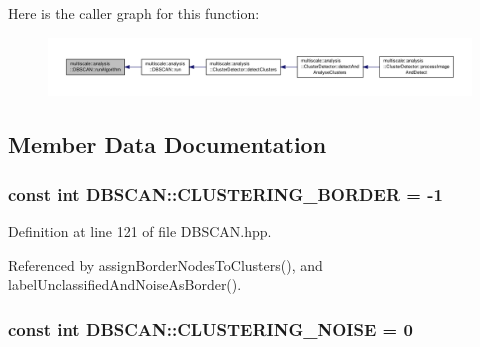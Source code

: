 Here is the caller graph for this function\-:\nopagebreak
\begin{figure}[H]
\begin{center}
\leavevmode
\includegraphics[width=350pt]{classmultiscale_1_1analysis_1_1DBSCAN_aceb5dd9fe24a24cbf09ddc9082dc1f82_icgraph}
\end{center}
\end{figure}




\subsection{Member Data Documentation}
\hypertarget{classmultiscale_1_1analysis_1_1DBSCAN_a28f37ffc029ccd1d121cbc4467851ce2}{
\subsubsection[{C\-L\-U\-S\-T\-E\-R\-I\-N\-G\-\_\-\-B\-O\-R\-D\-E\-R}]{\setlength{\rightskip}{0pt plus 5cm}const int D\-B\-S\-C\-A\-N\-::\-C\-L\-U\-S\-T\-E\-R\-I\-N\-G\-\_\-\-B\-O\-R\-D\-E\-R = -\/1\hspace{0.3cm}{\ttfamily [static]}}}\label{classmultiscale_1_1analysis_1_1DBSCAN_a28f37ffc029ccd1d121cbc4467851ce2}


Definition at line 121 of file D\-B\-S\-C\-A\-N.\-hpp.



Referenced by assign\-Border\-Nodes\-To\-Clusters(), and label\-Unclassified\-And\-Noise\-As\-Border().

\hypertarget{classmultiscale_1_1analysis_1_1DBSCAN_a480b43a01f8652787a4b0f61b00ee3cf}{
\subsubsection[{C\-L\-U\-S\-T\-E\-R\-I\-N\-G\-\_\-\-N\-O\-I\-S\-E}]{\setlength{\rightskip}{0pt plus 5cm}const int D\-B\-S\-C\-A\-N\-::\-C\-L\-U\-S\-T\-E\-R\-I\-N\-G\-\_\-\-N\-O\-I\-S\-E = 0\hspace{0.3cm}{\ttfamily [static]}}}\label{classmultiscale_1_1analysis_1_1DBSCAN_a480b43a01f8652787a4b0f61b00ee3cf}


